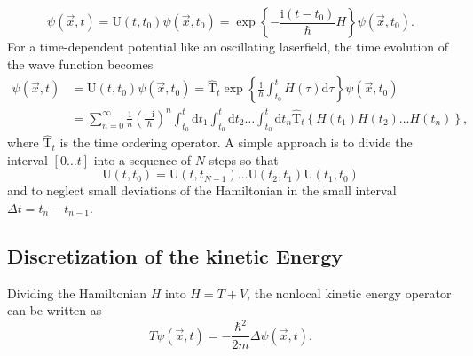 \documentclass[10pt,a4paper]{article} %
\renewcommand{\i}{{\mathrm{i}}}
\renewcommand{\d}{\mathrm{d}}
\begin{document}
   \begin{equation}
     \psi(\vec{x}, t) = \text{U}(t, t_0) \psi(\vec{x}, t_0)   = \exp \left\{ - \frac{\i (t-t_0) }{\hbar} H \right\}  \psi(\vec{x}, t_0) \text{.}
   \end{equation} 
   For a time-dependent potential like an oscillating laserfield, the time evolution of the wave function becomes
   \begin{align}
   \psi(\vec{x}, t) &= \text{U}(t, t_0) \psi(\vec{x}, t_0)  = \hat{\text{T}}_t  \exp \left\{ \frac{\i}{h} \int_{t_0}^t H(\tau) \d \tau \right \}  \psi(\vec{x}, t_0)  \\
   &=  \sum_{n = 0}^\infty \frac{1}{n} {\left( \frac{- \i}{\hbar} \right) }^n \int_{t_0}^t \d t_1\int_{t_0}^t \d t_2 \dots \int_{t_0}^t \d t_n \hat{\text{T}}_t \left\{ H(t_1)H(t_2) \dots H(t_n) \right\} \text{,} \nonumber
   \end{align} 
   where $\hat{\text{T}}_t$ is the time ordering operator. A simple approach is to divide the interval $[0 \dots t]$ into a sequence of $N$ steps so that
   \begin{equation}
   \text{U}(t, t_0) = \text{U}(t, t_{N-1}) \dots \text{U}(t_2, t_1)\text{U}(t_1, t_0)
\end{equation}   and to neglect small deviations of the Hamiltonian in the small interval $\Delta t = t_n - t_{n-1}$.
   
    \subsection{Discretization of the kinetic Energy}
    Dividing the Hamiltonian $H$ into $H = T + V$, the nonlocal kinetic energy operator can be written as
    \begin{equation}
    T \psi(\vec{x}, t) = - \frac{\hbar^2}{2m} \Delta \psi(\vec{x}, t) \text{.}
    \end{equation}
    
\end{document}
